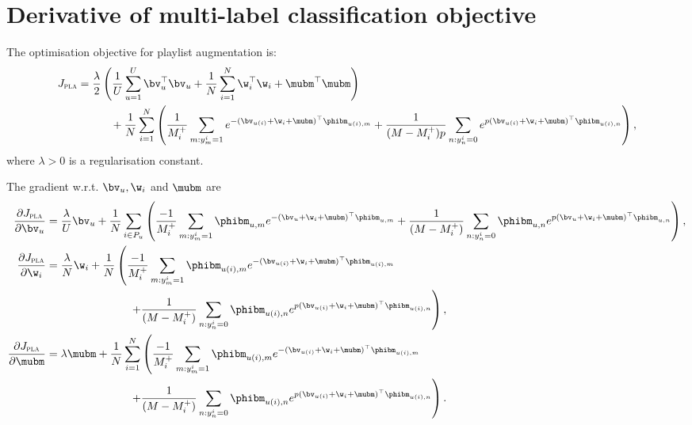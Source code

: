 \section{Derivative of multi-label classification objective}

The optimisation objective for playlist augmentation is:
\begin{equation*}
\begin{aligned}
J_\textsc{pla} &= \frac{\lambda}{2} \left( \frac{1}{U} \sum_{u=1}^U \bv_u^\top \bv_u 
     + \frac{1}{N} \sum_{i=1}^N \w_i^\top \w_i + \mubm^\top \mubm \right) \\
& \hspace{3em}
     + \frac{1}{N} \sum_{i=1}^N \left( \frac{1}{M_i^+} \sum_{m: y_m^i = 1} e^{-(\bv_{u(i)} + \w_i + \mubm)^\top \phibm_{u(i),m}} 
     + \frac{1}{(M - M_i^+) p} \sum_{n: y_n^i = 0} e^{p (\bv_{u(i)} + \w_i + \mubm)^\top \phibm_{u(i),n}} \right),
\end{aligned}
\end{equation*}
where $\lambda > 0$ is a regularisation constant.

The gradient w.r.t. $\bv_u, \w_i$ and $\mubm$ are
\begin{equation*}
\begin{aligned}
\frac{\partial J_\textsc{pla}}{\partial \bv_u}
&= \frac{\lambda}{U} \bv_u + \frac{1}{N} \sum_{i \in P_u} \left( 
   \frac{-1}{M_i^+} \sum_{m: y_m^i = 1} \phibm_{u,m} e^{-(\bv_{u} + \w_i + \mubm)^\top \phibm_{u,m}}
   + \frac{1}{(M - M_i^+)} \sum_{n: y_n^i = 0} \phibm_{u,n} e^{p (\bv_{u} + \w_i + \mubm)^\top \phibm_{u,n}} \right), \\
\frac{\partial J_\textsc{pla}}{\partial \w_i}
&= \frac{\lambda}{N} \w_i + \frac{1}{N} \left( 
   \frac{-1}{M_i^+} \sum_{m: y_m^i = 1} \phibm_{u(i),m} e^{-(\bv_{u(i)} + \w_i + \mubm)^\top \phibm_{u(i),m}} \right. \\
& \hspace{7.5em} \left.
   + \frac{1}{(M - M_i^+)} \sum_{n: y_n^i = 0} \phibm_{u(i),n} e^{p (\bv_{u(i)} + \w_i + \mubm)^\top \phibm_{u(i),n}} \right), \\
\frac{\partial J_\textsc{pla}}{\partial \mubm}
&= \lambda \mubm + \frac{1}{N} \sum_{i=1}^N \left( 
   \frac{-1}{M_i^+} \sum_{m: y_m^i = 1} \phibm_{u(i),m} e^{-(\bv_{u(i)} + \w_i + \mubm)^\top \phibm_{u(i),m}} \right. \\
& \hspace{7.5em} \left.
   + \frac{1}{(M - M_i^+)} \sum_{n: y_n^i = 0} \phibm_{u(i),n} e^{p (\bv_{u(i)} + \w_i + \mubm)^\top \phibm_{u(i),n}} \right).
\end{aligned}
\end{equation*}


